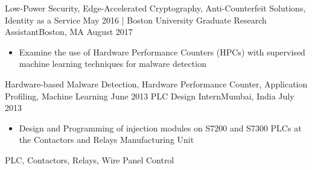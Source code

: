 \begin{experiences}
{\begin{itemize}
                      \end{itemize}
                    }
                    {Low-Power Security, Edge-Accelerated Cryptography, Anti-Counterfeit Solutions, Identity as a Service}
  \emptySeparator
  \experience
  {May 2016}       {| Boston University}{ Graduate Research Assistant}{Boston, MA}
  {August 2017}    {
                      \begin{itemize}
                        \item Examine the use of Hardware Performance Counters (HPCs) with supervised machine learning techniques for malware detection
                      \end{itemize}
                    }
                    {Hardware-based Malware Detection, Hardware Performance Counter, Application Profiling, Machine Learning}
  \emptySeparator
  \experience
    {June 2013}    {}{PLC Design Intern}{Mumbai, India}
    {July 2013}    {
                      \begin{itemize}
                        \item Design and Programming of injection modules on S7200 and S7300 PLCs at the Contactors and Relays Manufacturing Unit \\
                      \end{itemize}
                    }
                    {PLC, Contactors, Relays, Wire Panel Control}
\end{experiences}
